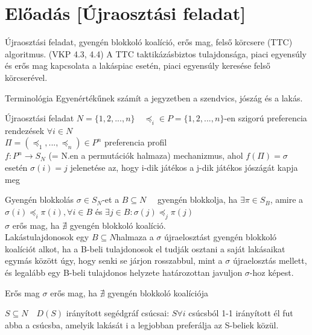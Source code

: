 	\section{Előadás [Újraosztási feladat]}
	Újraosztási feladat, gyengén blokkoló koalíció, erős mag, felső körcsere (TTC) algoritmus. (VKP 4.3, 4.4) A TTC taktikázásbiztos tulajdonsága, piaci egyensúly és erős mag kapcsolata a lakáspiac esetén, piaci egyensúly keresése felső körcserével.
	\begin{remark}{Terminológia}{}
		Egyenértékűnek számít a jegyzetben a szendvics, jószág és a lakás.
	\end{remark}
	\begin{definition}{Újraosztási feladat}{}
		$N = \{1, 2, ..., n\} \quad \preceq_i \in P = \{1, 2, ..., n\}$-en szigorú preferencia rendezések $\forall i \in N$ \\
		$\Pi = (\preceq_1, ..., \preceq_n) \in P^n$ preferencia profil \\
		$f: P^n \rightarrow S_N$ (= N.en a permutációk halmaza) mechanizmus, ahol $f(\Pi) = \sigma$ esetén $\sigma(i) = j$ jelenetése az, hogy i-dik játékos a j-dik játékos jószágát kapja meg
	\end{definition}
	
	\begin{definition}{Gyengén blokkolás}{}
		$\sigma \in S_N$-et a $B \subseteq N \quad$ gyengén blokkolja, ha $\exists \pi \in S_B$, amire a $\sigma(i) \preceq_i \pi(i), \forall i \in B$ és $\exists j \in B :  \sigma(j) \preceq_j \pi(j) $\\
		$\sigma$ erős mag, ha $\nexists$ gyengén blokkoló koalíció. \\
		Lakástulajdonosok egy $B \subseteq N$halmaza a $\sigma$ újraelosztást gyengén blokkoló koalíciót alkot,
		ha a B-beli tulajdonosok el tudják osztani a saját lakásaikat egymás között úgy, hogy senki se
		járjon rosszabbul, mint a $\sigma$ újraelosztás mellett, és legalább egy B-beli tulajdonos helyzete határozottan javuljon $\sigma$-hoz képest. 
	\end{definition}
	
	\begin{definition}{Erős mag}{}
		$\sigma$ erős mag, ha $\nexists$ gyengén blokkoló koalíciója
	\end{definition}
	
	\begin{definition}{}{}
		$S \subseteq N \quad D(S)$ irányított segédgráf csúcsai: $S \forall i $ csúcsból 1-1 irányított él fut abba a csúcsba, amelyik lakását i a legjobban preferálja az S-beliek közül.
	\end{definition}
	
